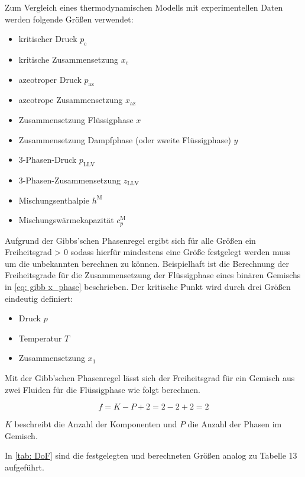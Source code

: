 \documentclass[../thesis.tex]{subfiles}
\begin{document}
Zum Vergleich eines thermodynamischen Modells mit experimentellen Daten werden folgende Größen verwendet:
\begin{itemize}
	\item kritischer Druck $ p_\mathrm{c} $
	\item kritische Zusammensetzung $ x_\mathrm{c} $
	\item azeotroper Druck $ p_\mathrm{az} $
	\item azeotrope Zusammensetzung $ x_\mathrm{az} $
	\item Zusammensetzung Flüssigphase $ x $
	\item Zusammensetzung Dampfphase (oder zweite Flüssigphase) $ y $
	\item 3-Phasen-Druck $p_{\mathrm{LLV}}$
	\item 3-Phasen-Zusammensetzung $z_{\mathrm{LLV}}$
	\item Mischungsenthalpie $h^{\mathrm{M}}$
	\item Mischungswärmekapazität $c_p^{\mathrm{M}}$
\end{itemize}

Aufgrund der Gibbs'schen Phasenregel ergibt sich für alle Größen ein Freiheitsgrad > 0 sodass hierfür mindestens eine Größe festgelegt werden muss um die unbekannten berechnen zu können. Beispielhaft ist die Berechnung der Freiheitsgrade für die Zusammensetzung der Flüssigphase eines binären Gemischs in \autoref{eq: gibb x_phase} beschrieben.
Der kritische Punkt wird durch drei Größen eindeutig definiert:
\begin{itemize}
	\item Druck $p$
	\item Temperatur $T$
	\item Zusammensetzung $x_1$
\end{itemize}

Mit der Gibb'schen Phasenregel lässt sich der Freiheitsgrad für ein Gemisch aus zwei Fluiden für die Flüssigphase wie folgt berechnen.

\begin{equation}
	\label{eq: gibb x_phase}
	f = K - P + 2 = 2 - 2 + 2 = 2
\end{equation}

$ K $ beschreibt die Anzahl der Komponenten und $ P $ die Anzahl der Phasen im Gemisch.

In \autoref{tab: DoF} sind die festgelegten und berechneten Größen analog zu Tabelle 13 \cite{jaubert2020benchmark} aufgeführt.
\end{document}
